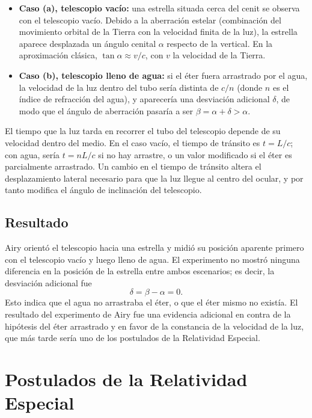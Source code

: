 \begin{itemize}
    \item \textbf{Caso (a), telescopio vacío:} una estrella situada cerca del cenit se observa con el telescopio vacío. Debido a la aberración estelar (combinación del movimiento orbital de la Tierra con la velocidad finita de la luz), la estrella aparece desplazada un ángulo cenital $\alpha$ respecto de la vertical. En la aproximación clásica, $\tan\alpha\approx v/c$, con $v$ la velocidad de la Tierra.
    \item \textbf{Caso (b), telescopio lleno de agua:} si el éter fuera arrastrado por el agua, la velocidad de la luz dentro del tubo sería distinta de $c/n$ (donde $n$ es el índice de refracción del agua), y aparecería una desviación adicional $\delta$, de modo que el ángulo de aberración pasaría a ser $\beta=\alpha+\delta>\alpha$.
\end{itemize}

El tiempo que la luz tarda en recorrer el tubo del telescopio depende de su velocidad dentro del medio. En el caso vacío, el tiempo de tránsito es $t=L/c$; con agua, sería $t=nL/c$ si no hay arrastre, o un valor modificado si el éter es parcialmente arrastrado. Un cambio en el tiempo de tránsito altera el desplazamiento lateral necesario para que la luz llegue al centro del ocular, y por tanto modifica el ángulo de inclinación del telescopio.

\subsection{Resultado}

Airy orientó el telescopio hacia una estrella y midió su posición aparente primero con el telescopio vacío y luego lleno de agua. El experimento no mostró ninguna diferencia en la posición de la estrella entre ambos escenarios; es decir, la desviación adicional fue
$$
\delta=\beta-\alpha=0.
$$
Esto indica que el agua no arrastraba el éter, o que el éter mismo no existía. El resultado del experimento de Airy fue una evidencia adicional en contra de la hipótesis del éter arrastrado y en favor de la constancia de la velocidad de la luz, que más tarde sería uno de los postulados de la Relatividad Especial.



\section{Postulados de la Relatividad Especial}

